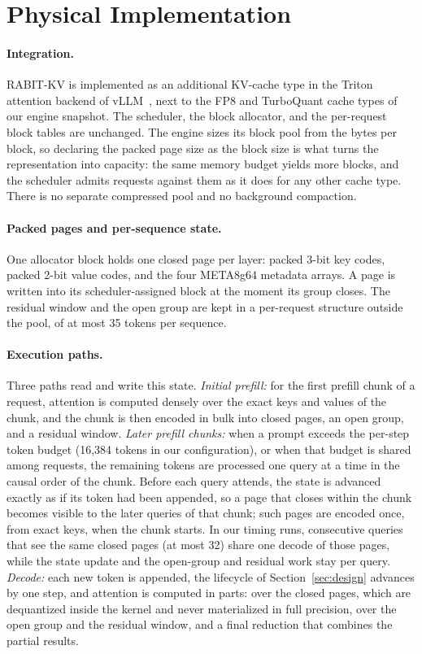 \documentclass{article}
\begin{document}
\section{Physical Implementation}
\label{sec:impl}

\paragraph{Integration.}
RABIT-KV is implemented as an additional KV-cache type in the Triton attention backend of
vLLM~\citep{kwon2023vllm}, next to the FP8 and TurboQuant cache types of our engine snapshot.
The scheduler, the block allocator, and the per-request block tables are unchanged. The engine sizes
its block pool from the bytes per block, so declaring the packed page size as the block size is what
turns the representation into capacity: the same memory budget yields more blocks, and the scheduler
admits requests against them as it does for any other cache type. There is no separate compressed pool
and no background compaction.

\paragraph{Packed pages and per-sequence state.}
One allocator block holds one closed page per layer: packed 3-bit key codes, packed 2-bit value codes,
and the four META8g64 metadata arrays. A page is written into its scheduler-assigned block at the
moment its group closes. The residual window and the open group are kept in a per-request
structure outside the pool, of at most 35 tokens per sequence.

\paragraph{Execution paths.}
Three paths read and write this state. \emph{Initial prefill:} for the first prefill chunk of a
request, attention is computed densely over the exact keys and values of the chunk, and the chunk is
then encoded in bulk into closed pages, an open group, and a residual window. \emph{Later prefill
chunks:} when a prompt exceeds the per-step token budget (16,384 tokens in our configuration), or when
that budget is shared among requests, the remaining tokens are processed one query at a time in the
causal order of the chunk. Before each query attends, the state is advanced exactly as if its token had
been appended, so a page that closes within the chunk becomes visible to the later queries of that
chunk; such pages are encoded once, from exact keys, when the chunk starts. In our timing runs,
consecutive queries that see the same closed pages (at most 32) share one decode of those pages, while
the state update and the open-group and residual work stay per query. \emph{Decode:} each new token is appended, the lifecycle of Section~\ref{sec:design}
advances by one step, and attention is computed in parts: over the closed pages, which are dequantized
inside the kernel and never materialized in full precision, over the open group and the residual
window, and a final reduction that combines the partial results.
\end{document}

